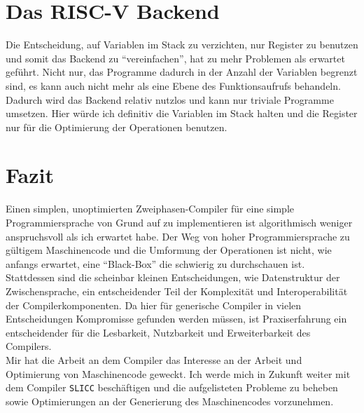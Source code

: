 \section{Das RISC-V Backend}

Die Entscheidung, auf Variablen im Stack zu verzichten, nur Register zu benutzen und somit das Backend zu ``vereinfachen'', hat zu mehr Problemen als erwartet geführt.
Nicht nur, das Programme dadurch in der Anzahl der Variablen begrenzt sind, es kann auch nicht mehr als eine Ebene des Funktionsaufrufs behandeln.\\
Dadurch wird das Backend relativ nutzlos und kann nur triviale Programme umsetzen.
Hier würde ich definitiv die Variablen im Stack halten und die Register nur für die Optimierung der Operationen benutzen.\\

\section{Fazit}

Einen simplen, unoptimierten Zweiphasen-Compiler für eine simple Programmiersprache von Grund auf zu implementieren ist algorithmisch weniger anspruchsvoll als ich erwartet habe.
Der Weg von hoher Programmiersprache zu gültigem Maschinencode und die Umformung der Operationen ist nicht, wie anfangs erwartet, eine ``Black-Box'' die schwierig zu durchschauen ist.\\
Stattdessen sind die scheinbar kleinen Entscheidungen, wie Datenstruktur der Zwischensprache, ein entscheidender Teil der
Komplexität und Interoperabilität der Compilerkomponenten.
Da hier für generische Compiler in vielen Entscheidungen Kompromisse gefunden werden müssen, ist Praxiserfahrung ein entscheidender für die Lesbarkeit, Nutzbarkeit und Erweiterbarkeit des Compilers.\\

Mir hat die Arbeit an dem Compiler das Interesse an der Arbeit und Optimierung von Maschinencode geweckt.
Ich werde mich in Zukunft weiter mit dem Compiler \texttt{SLICC} beschäftigen und die aufgelisteten Probleme zu beheben sowie Optimierungen an der Generierung des Maschinencodes vorzunehmen.\\
